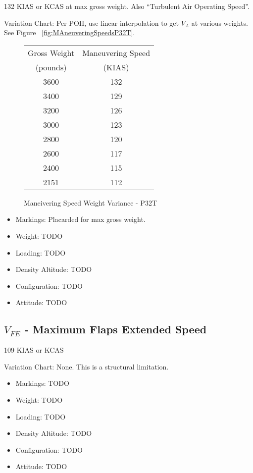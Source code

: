 132 KIAS or KCAS at max gross weight. Also ``Turbulent Air Operating Speed''.

Variation Chart: Per POH, use linear interpolation to get $V_A$ at various weights. See Figure ~\ref{fig:MAneuveringSpeedsP32T}.

\begin{figure}
\begin{center}
\begin{tabular}{ |c|c| }
    \hline
    Gross Weight & Maneuvering Speed \\
    (pounds) & (KIAS) \\
    \hline
     3600 &  132 \\
     3400 &  129 \\
    \hline
     3200 &  126 \\
     3000 &  123 \\
    \hline
     2800 &  120 \\
     2600 &  117 \\
    \hline
     2400 &  115 \\
     2151 &  112 \\
    \hline
\end{tabular}
\end{center}
\caption{Maneivering Speed Weight Variance - P32T}
\label{fig:ManeuveringSpeedsP32T}
\end{figure}

\begin{itemize}
\item Markings: Placarded for max gross weight.
\item Weight: TODO
\item Loading: TODO
\item Density Altitude: TODO
\item Configuration: TODO
\item Attitude: TODO
\end{itemize}

\subsection{$V_{FE}$ - Maximum Flaps Extended Speed}

109 KIAS or KCAS

Variation Chart: None. This is a structural limitation.

\begin{itemize}
\item Markings: TODO
\item Weight: TODO
\item Loading: TODO
\item Density Altitude: TODO
\item Configuration: TODO
\item Attitude: TODO
\end{itemize}

